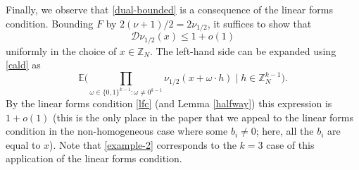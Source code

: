 \documentclass[12pt,a4paper,reqno]{amsart}
\numberwithin{equation}{section}
\theoremstyle{plain}
\theoremstyle{definition}
\renewcommand{\leq}{\leqslant}
\def\E{{\mathbb E}}
\def\ni{\noindent}
\def\endproof{\hfill{\usebox{\proofbox}}}
\begin{document}
\ni Finally, we observe that \eqref{dual-bounded} is a consequence of the linear forms condition.  Bounding $F$ by $2 (\nu+1)/2 = 2 \nu_{1/2}$, it suffices to show
that
$$ {\mathcal D} \nu_{1/2}(x) \leq 1 + o(1) $$
uniformly in the choice of $x \in \mathbb{Z}_N$.  The left-hand side can be expanded using \eqref{cald} as
$$ \E\bigg( \prod_{\omega \in \{0,1\}^{k-1}: \omega \neq 0^{k-1}} \nu_{1/2}(x + \omega \cdot h) \; \bigg| \;  h \in \mathbb{Z}_N^{k-1} \bigg).$$
By the linear forms condition \eqref{lfc} (and Lemma \ref{halfway}) this expression is $1 + o(1)$ (this is the only place in the paper that we appeal to the linear forms condition in the non-homogeneous case where some $b_i \neq 0$; here, all the $b_i$ are equal to $x$).  Note that
\eqref{example-2} corresponds to the $k=3$ case of this application of the linear forms condition.\endproof\vspace{11pt}
\end{document}

